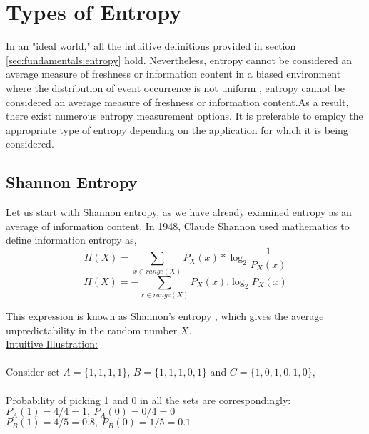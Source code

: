 \section{Types of Entropy} 
\label{sec:fundamentals:types}
In an "ideal world," all the intuitive definitions provided in section \ref{sec:fundamentals:entropy} hold. Nevertheless, entropy cannot be considered an average measure of freshness or information content in a biased environment where the distribution of event occurrence is not uniform \cite{Lec20IT-2013}, entropy cannot be considered an average measure of freshness or information content.As a result, there exist numerous entropy measurement options. It is preferable to employ the appropriate type of entropy depending on the application for which it is being considered.

%
%
\subsection{Shannon Entropy}
\label{subsec:fundamentals:types:shannon}

Let us start with Shannon entropy, as we have already examined entropy as an average of information content. In 1948, Claude Shannon used mathematics to define information entropy as,
\begin{equation*}
H(X) = \sum_{x \in range(X)} P_{X}(x)*\log_{2}\frac{1}{P_{X}(x)} 
\end{equation*}
\begin{equation}\label{eq:2:2}
H(X) = {-}\sum_{x \in range(X)} P_{X}(x).\log_{2}P_{X}(x) 
\end{equation}

This expression is known as Shannon’s entropy \cite{IEEE-1948}, which gives the average unpredictability in the random number $X$.\\

\underline{Intuitive Illustration:} \\\\
Consider set $A = \{1,1,1,1\}$, $B = \{1,1,1,0,1\}$ and $C = \{1,0,1,0,1,0\}$,\\\\
Probability of picking 1 and 0 in all the sets are correspondingly:\\

$P_{A}(1) = 4/4 = 1,\ P_{A}(0) = 0/4 = 0$\\
 
$P_{B}(1) = 4/5 = 0.8,\ P_{B}(0) = 1/5 = 0.1$\\

